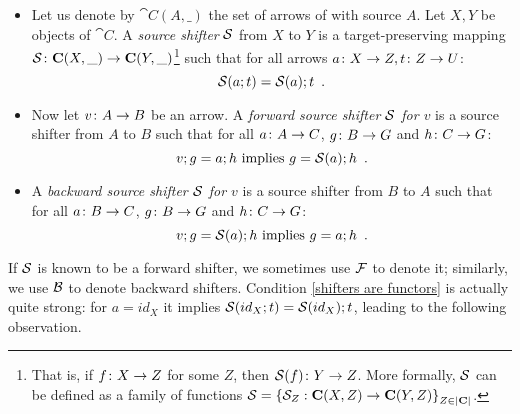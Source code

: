 \begin{definition}
\begin{itemize}[topsep=\smallskipamount]
\item Let us denote by $\cat{C}(A,\_)$ the set of arrows of  with source $A$. Let $X,Y$ be objects of $\cat{C}$. A \emph{source shifter} $\mathcal{S}$ from $X$ to $Y$ is a target-preserving mapping $\mathcal{S} \colon \mathbf{C}(X,\_) \rightarrow \mathbf{C}(Y, \_)$\footnote{That is, if $f\colon X \rightarrow Z$ for some $Z$, then $\mathcal{S}(f)\colon Y \rightarrow Z$. More formally, $\mathcal{S}$  can be defined as a family of functions $\mathcal{S} = \left\{\mathcal{S}_Z : \mathbf{C}(X, Z) \rightarrow \mathbf{C}(Y, Z)\right\}_{Z\in |\mathbf{C}|}$.} such that for all arrows $a\colon X\rightarrow Z, t\colon Z\rightarrow U$:
\begin{equation}\eqlabel{shifters are functors}
\cS(a;t) = \cS(a);t \enspace.
\end{equation}
%
\item Now let $v\colon A\rightarrow B$ be an arrow. A \emph{forward source shifter $\mathcal{S}$ for $v$} is a source shifter from $A$ to $B$ such that for all $a\colon A\rightarrow C$, $g\colon B\rightarrow G$ and $h\colon C\rightarrow G$:
%
\begin{equation}\eqlabel{forward condition}
v;g = a;h \text{ implies } g = \cS(a);h \enspace.
\end{equation}
%
\item A \emph{backward source shifter $\mathcal{S}$ for $v$} is a source shifter from $B$ to $A$ such that for all $a\colon B\rightarrow C$, $g\colon B\rightarrow G$ and $h\colon C\rightarrow G$:
%
\begin{equation}\eqlabel{backward condition}
v;g = \cS(a);h \text{ implies } g = a;h \enspace.
\end{equation}
\end{itemize}
\end{definition}
%
If $\mathcal{S}$ is known to be a forward shifter, we sometimes use $\mathcal{F}$ to denote it; similarly, we use $\mathcal{B}$ to denote backward shifters. 
Condition \eqref{shifters are functors} is actually quite strong: for $a = id_X$ it implies $\mathcal{S}(id_X;t) = \mathcal{S}(id_X);t$,  leading to the following observation.

